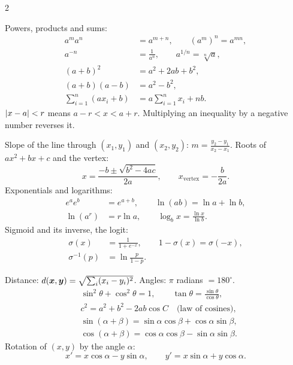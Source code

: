 \begin{multicols}{2}
\raggedcolumns
\small
\setlength{\abovedisplayskip}{4pt plus 1pt}
\setlength{\belowdisplayskip}{4pt plus 1pt}
\setlength{\abovedisplayshortskip}{2pt plus 1pt}
\setlength{\belowdisplayshortskip}{2pt plus 1pt}

Powers, products and sums:
\begin{align*}
  a^ma^n &= a^{m+n}, \qquad (a^m)^n = a^{mn},\\
  a^{-n} &= \frac{1}{a^n}, \qquad a^{1/n} = \sqrt[n]{a},\\
  (a + b)^2 &= a^2 + 2ab + b^2,\\
  (a + b)(a - b) &= a^2 - b^2,\\
  \sum_{i=1}^n(ax_i + b) &= a\sum_{i=1}^nx_i + nb .
\end{align*}
$\lvert x - a\rvert < r$ means $a - r < x < a + r$. Multiplying an inequality by a
negative number reverses it.

Slope of the line through $(x_1, y_1)$ and $(x_2, y_2)$:
$m = \frac{y_2 - y_1}{x_2 - x_1}$.
Roots of $ax^2 + bx + c$ and the vertex:
\[
  x = \frac{-b \pm \sqrt{b^2 - 4ac}}{2a}, \qquad x_{\text{vertex}} = -\frac{b}{2a} .
\]
Exponentials and logarithms:
\begin{align*}
  e^ae^b &= e^{a+b}, \qquad \ln(ab) = \ln a + \ln b,\\
  \ln(a^r) &= r\ln a, \qquad \log_bx = \frac{\ln x}{\ln b} .
\end{align*}
Sigmoid and its inverse, the logit:
\begin{align*}
  \sigma(x) &= \frac{1}{1 + e^{-x}}, \qquad 1 - \sigma(x) = \sigma(-x),\\
  \sigma^{-1}(p) &= \ln\frac{p}{1 - p} .
\end{align*}

Distance: $d(\bm{x}, \bm{y}) = \sqrt{\sum_i(x_i - y_i)^2}$. Angles: $\pi$ radians $= 180^\circ$.
\begin{align*}
  &\sin^2\theta + \cos^2\theta = 1, \qquad \tan\theta = \frac{\sin\theta}{\cos\theta},\\
  &c^2 = a^2 + b^2 - 2ab\cos C \quad\text{(law of cosines)},\\
  &\sin(\alpha + \beta) = \sin\alpha\cos\beta + \cos\alpha\sin\beta,\\
  &\cos(\alpha + \beta) = \cos\alpha\cos\beta - \sin\alpha\sin\beta .
\end{align*}
Rotation of $(x, y)$ by the angle $\alpha$:
\[
  x' = x\cos\alpha - y\sin\alpha, \qquad y' = x\sin\alpha + y\cos\alpha .
\]


\end{multicols}
